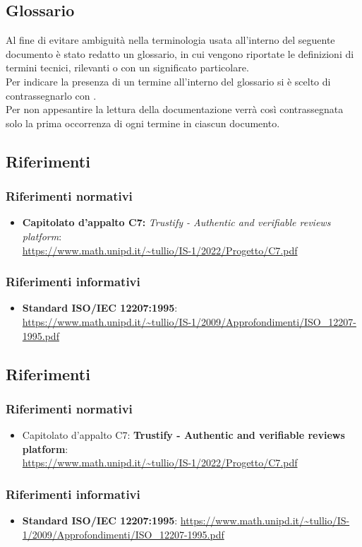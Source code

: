 \subsection{Glossario}
Al fine di evitare ambiguità nella terminologia usata all'interno del seguente
documento è stato redatto un glossario, in cui vengono riportate le definizioni
di termini tecnici, rilevanti o con un significato particolare. \\ Per indicare
la presenza di un termine all'interno del glossario si è scelto di
contrassegnarlo con \glo.\\ Per non appesantire la lettura della documentazione
verrà così contrassegnata solo la prima occorrenza di ogni termine in ciascun
documento.

\subsection{Riferimenti}
\subsubsection{Riferimenti normativi}
\begin{itemize}
    \item \textbf{Capitolato d'appalto C7:} \textit{Trustify - Authentic and verifiable reviews platform}: \\
          \url{https://www.math.unipd.it/~tullio/IS-1/2022/Progetto/C7.pdf}
\end{itemize}
\subsubsection{Riferimenti informativi}
\begin{itemize}
    \item \textbf{Standard ISO/IEC 12207:1995}: \\
          \url{https://www.math.unipd.it/~tullio/IS-1/2009/Approfondimenti/ISO_12207-1995.pdf}
\end{itemize}
    \subsection{Riferimenti}
        \subsubsection{Riferimenti normativi}
            \begin{itemize}
                \item Capitolato d'appalto C7: \textbf{Trustify - Authentic and verifiable reviews platform}: \\
                \url{https://www.math.unipd.it/~tullio/IS-1/2022/Progetto/C7.pdf}
            \end{itemize}
        \subsubsection{Riferimenti informativi}
            \begin{itemize}
                \item \textbf{Standard ISO/IEC 12207:1995}: \url{https://www.math.unipd.it/~tullio/IS-1/2009/Approfondimenti/ISO_12207-1995.pdf}
            \end{itemize}
